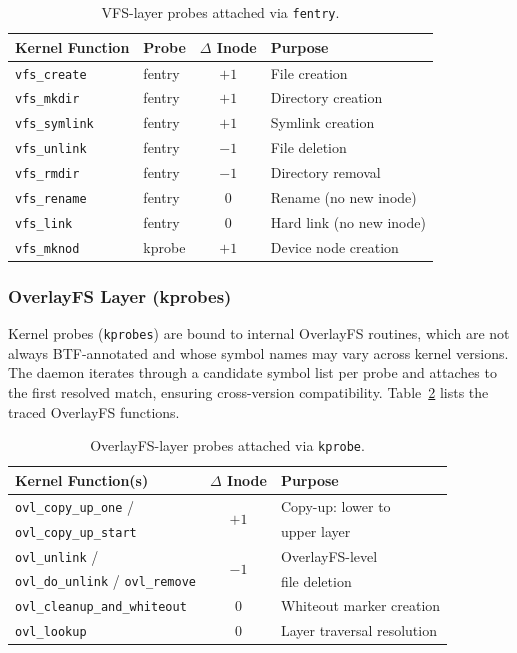 \documentclass[conference]{IEEEtran}
\begin{document}
\begin{table}[t]
\centering
\caption{VFS-layer probes attached via \texttt{fentry}.}
\label{tab:vfs_probes}
\small
\begin{tabular}{@{}llcl@{}}
\toprule
\textbf{Kernel Function} & \textbf{Probe} & \textbf{$\Delta$ Inode} & \textbf{Purpose} \\
\midrule
\texttt{vfs\_create}  & fentry & $+1$ & File creation \\
\texttt{vfs\_mkdir}   & fentry & $+1$ & Directory creation \\
\texttt{vfs\_symlink}  & fentry & $+1$ & Symlink creation \\
\texttt{vfs\_unlink}  & fentry & $-1$ & File deletion \\
\texttt{vfs\_rmdir}   & fentry & $-1$ & Directory removal \\
\texttt{vfs\_rename}  & fentry & $0$  & Rename (no new inode) \\
\texttt{vfs\_link}    & fentry & $0$  & Hard link (no new inode) \\
\texttt{vfs\_mknod}   & kprobe & $+1$ & Device node creation \\
\bottomrule
\end{tabular}
\end{table}

\subsubsection{OverlayFS Layer (kprobes)}
Kernel probes (\texttt{kprobes}) are bound to internal OverlayFS routines, which are not always BTF-annotated and whose symbol names may vary across kernel versions. The daemon iterates through a candidate symbol list per probe and attaches to the first resolved match, ensuring cross-version compatibility. Table~\ref{tab:ovl_probes} lists the traced OverlayFS functions.

\begin{table}[t]
\centering
\caption{OverlayFS-layer probes attached via \texttt{kprobe}.}
\label{tab:ovl_probes}
\small
\begin{tabular}{@{}lcl@{}}
\toprule
\textbf{Kernel Function(s)} & \textbf{$\Delta$ Inode} & \textbf{Purpose} \\
\midrule
\texttt{ovl\_copy\_up\_one} / & \multirow{2}{*}{$+1$} & Copy-up: lower to \\
\texttt{ovl\_copy\_up\_start} & & upper layer \\
\midrule
\texttt{ovl\_unlink} / & \multirow{2}{*}{$-1$} & OverlayFS-level \\
\texttt{ovl\_do\_unlink} / \texttt{ovl\_remove} & & file deletion \\
\midrule
\texttt{ovl\_cleanup\_and\_whiteout} & $0$ & Whiteout marker creation \\
\texttt{ovl\_lookup} & $0$ & Layer traversal resolution \\
\bottomrule
\end{tabular}
\end{table}
\end{document}

